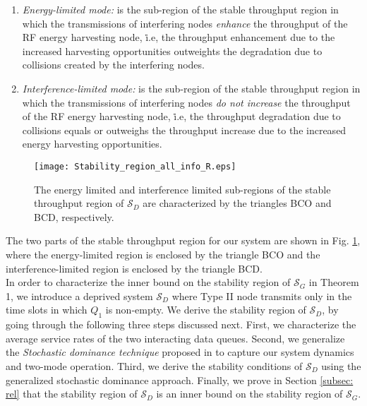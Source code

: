 \documentclass[draftcls,12pt,onecolumn]{IEEEtran}
\begin{document}
\begin{enumerate}
\item \emph{Energy-limited mode:} is the sub-region of the stable throughput region in which the transmissions of interfering nodes \emph{enhance} the throughput of the RF energy harvesting node, \.i.e, the throughput enhancement due to the increased harvesting opportunities outweights the degradation due to collisions created by the interfering nodes.
\item \emph{Interference-limited mode:} is the sub-region of the stable throughput region in which the transmissions of interfering nodes \emph{do not increase} the throughput of the RF energy harvesting node, \.i.e, the throughput degradation due to collisions equals or outweighs the throughput increase due to the increased energy harvesting opportunities.
\end{enumerate} 
\begin{figure}
\texttt{[image: Stability\_region\_all\_info\_R.eps]}
\centering
\caption{The energy limited and interference limited sub-regions of the stable throughput region of $\mathcal{S}_D$ are characterized by the triangles BCO and BCD, respectively.}\label{fig:region}
\end{figure}
\indent The two parts of the stable throughput region for our system are shown in Fig. \ref{fig:region}, where the energy-limited region is enclosed by the triangle BCO and the interference-limited region is enclosed by the triangle BCD.\\
\indent In order to characterize the inner bound on the stability region of $\mathcal{S}_G$ in Theorem 1, we introduce a deprived system $\mathcal{S}_D$ where Type II node transmits only in the time slots in which $Q_1$ is non-empty. We derive the stability region of $\mathcal{S}_D$, by going through the following three steps discussed next. First, we characterize the average service rates of the two interacting data queues. Second, we generalize the \emph{Stochastic dominance technique} proposed in \cite{rao1988stability} to capture our system dynamics and two-mode operation. Third, we derive the stability conditions of $\mathcal{S}_D$ using the generalized stochastic dominance approach. Finally, we prove in Section \ref{subsec: rel} that the stability region of $\mathcal{S}_D$ is an inner bound on the stability region of $\mathcal{S}_G$.
\vspace{-0.15in}
\end{document}
